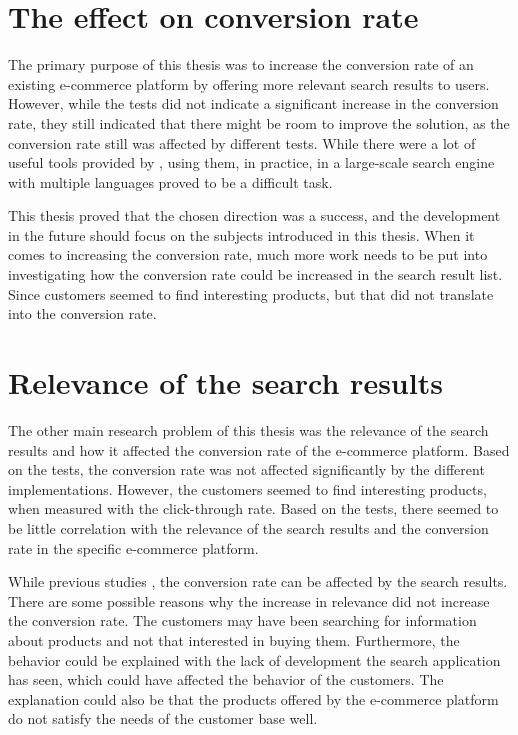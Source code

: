 



\section{The effect on conversion rate}

The primary purpose of this thesis was to increase the conversion rate of an existing e-commerce platform by offering
more relevant search results to users. 
However, while the tests did not indicate a significant increase in the conversion rate, they still
indicated that there might be room to improve the solution, as the conversion rate still was affected by different
tests.
While there were a lot of useful tools provided by \citeauthor{relevantSearch} \cite{relevantSearch}, 
using them, in practice, in a large-scale search engine with multiple languages proved to be a difficult task.

This thesis proved that the chosen direction was a success, and the development in the future
should focus on the subjects introduced in this thesis.
When it comes to increasing the conversion rate, much more work needs to be put into investigating 
how the conversion rate could be increased in the search result list.
Since customers seemed to find interesting products, but that did not translate into the conversion rate.


\section{Relevance of the search results}

The other main research problem of this thesis was the relevance of the search results and how it affected the conversion rate 
of the e-commerce platform.
Based on the tests, the conversion rate was not affected significantly by the different implementations.
However, the customers seemed to find interesting products, when measured with the 
click-through rate. 
Based on the tests, there seemed to be little correlation with the relevance of the search results
and the conversion rate in the specific e-commerce platform.

While previous studies \cite{enhancingSearchBestSelling, relevantSearch}, 
the conversion rate can be affected by the search results.
There are some possible reasons why the increase in relevance did not increase the conversion rate.
The customers may have been searching for information about products and not that interested in buying them.
Furthermore, the behavior could be explained with the lack of development the search application has seen, 
which could have affected the behavior of the customers.
The explanation could also be that the products offered by the e-commerce platform do not satisfy the needs of the customer base well.

